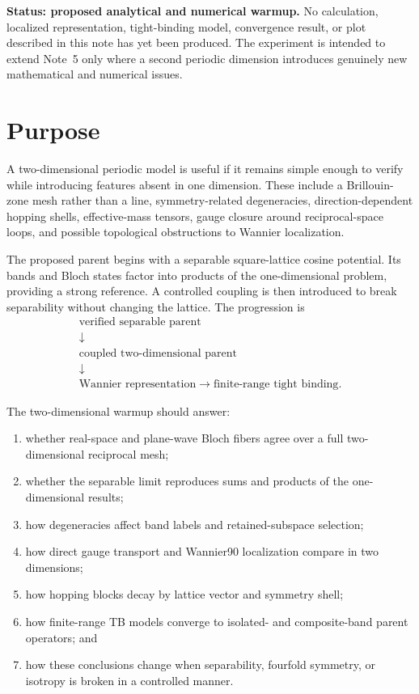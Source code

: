 
\textbf{Status: proposed analytical and numerical warmup.} No calculation,
localized representation, tight-binding model, convergence result, or plot
described in this note has yet been produced. The experiment is intended to
extend Note~5 only where a second periodic dimension introduces genuinely new
mathematical and numerical issues.

\section*{Purpose}

A two-dimensional periodic model is useful if it remains simple enough to
verify while introducing features absent in one dimension. These include a
Brillouin-zone mesh rather than a line, symmetry-related degeneracies,
direction-dependent hopping shells, effective-mass tensors, gauge closure
around reciprocal-space loops, and possible topological obstructions to
Wannier localization.

The proposed parent begins with a separable square-lattice cosine potential.
Its bands and Bloch states factor into products of the one-dimensional problem,
providing a strong reference. A controlled coupling is then introduced to
break separability without changing the lattice. The progression is
\begin{equation}
    \begin{gathered}
        \text{verified separable parent}
        \\
        \downarrow
        \\
        \text{coupled two-dimensional parent}
        \\
        \downarrow
        \\
        \text{Wannier representation}
        \longrightarrow
        \text{finite-range tight binding}.
    \end{gathered}
\end{equation}

The two-dimensional warmup should answer:
\begin{enumerate}
    \item whether real-space and plane-wave Bloch fibers agree over a full
          two-dimensional reciprocal mesh;
    \item whether the separable limit reproduces sums and products of the
          one-dimensional results;
    \item how degeneracies affect band labels and retained-subspace selection;
    \item how direct gauge transport and Wannier90 localization compare in two
          dimensions;
    \item how hopping blocks decay by lattice vector and symmetry shell;
    \item how finite-range TB models converge to isolated- and composite-band
          parent operators; and
    \item how these conclusions change when separability, fourfold symmetry,
          or isotropy is broken in a controlled manner.
\end{enumerate}

